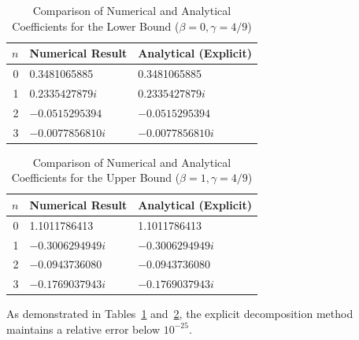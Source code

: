 \begin{table}[h!]
\centering
\caption{Comparison of Numerical and Analytical Coefficients for the Lower Bound ($\beta = 0, \gamma = 4/9$)}
\label{tab:lower_bounds}
\begin{tabular}{rll}
\hline
$n$ & Numerical Result & Analytical (Explicit) \\
\hline
0 & 0.3481065885 & 0.3481065885 \\
1 & $0.2335427879i$ & $0.2335427879i$ \\
2 & $-0.0515295394$ & $-0.0515295394$ \\
3 & $-0.0077856810i$ & $-0.0077856810i$ \\
\hline
\end{tabular}
\end{table}





\begin{table}[h!]
\centering
\caption{Comparison of Numerical and Analytical Coefficients for the Upper Bound ($\beta = 1, \gamma = 4/9$)}
\label{tab:upper_bounds}
\begin{tabular}{rll}
\hline
$n$ & Numerical Result & Analytical (Explicit) \\
\hline
0 & 1.1011786413 & 1.1011786413 \\
1 & $-0.3006294949i$ & $-0.3006294949i$ \\
2 & $-0.0943736080$ & $-0.0943736080$ \\
3 & $-0.1769037943i$ & $-0.1769037943i$ \\
\hline
\end{tabular}
\end{table}



As demonstrated in Tables~\ref{tab:lower_bounds} and~\ref{tab:upper_bounds}, the explicit decomposition method maintains a relative error below $10^{-25}$.



